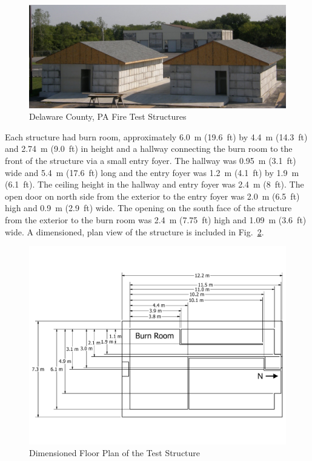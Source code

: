 \documentclass[12pt,oneside]{book}
\begin{document}
\begin{figure}[!ht]
	\includegraphics[width=6in]{../Figures/Pictures/DelCo_Structures}
	\caption{Delaware County, PA Fire Test Structures}
	\label{fig:Delaware_County,_PA_Fire_Test_Structures}
\end{figure}

Each structure had burn room, approximately 6.0~m (19.6~ft) by 4.4~m (14.3~ft) and 2.74~m (9.0~ft) in height and a hallway connecting the burn room to the front of the structure via a small entry foyer. The hallway was 0.95~m (3.1~ft) wide and 5.4~m (17.6~ft) long and the entry foyer was 1.2~m (4.1~ft) by 1.9~m (6.1~ft). The ceiling height in the hallway and entry foyer was 2.4~m (8~ft).  The open door on north side from the exterior to the entry foyer was 2.0~m (6.5~ft) high and 0.9~m (2.9~ft) wide. The opening on the south face of the structure from the exterior to the burn room was 2.4~m (7.75~ft) high and 1.09~m (3.6~ft) wide. A dimensioned, plan view of the structure is included in Fig.~\ref{fig:Test_Structure_Floor_Plan}.

\begin{figure}[!ht]
	\includegraphics[width=\columnwidth]{../Figures/Floor_Plans/PDFs/East_Structure/DelCo_2012_East_Structure_Plain}
	\caption{Dimensioned Floor Plan of the Test Structure}
	\label{fig:Test_Structure_Floor_Plan}
\end{figure}
\end{document}
